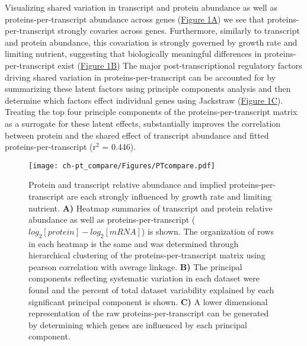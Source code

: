 Visualizing shared variation in transcript and protein abundance as well as proteins-per-transcript abundance across genes (\hyperref[ptHM]{Figure \ref{ptHM}A}) we see that proteins-per-transcript strongly covaries across genes.  Furthermore, similarly to transcript and protein abundance, this covariation is strongly governed by growth rate and limiting nutrient, suggesting that biologically meaningful differences in proteins-per-transcript exist (\hyperref[ptHM]{Figure \ref{ptHM}B}) The major post-transcriptional regulatory factors driving shared variation in proteins-per-transcript can be accounted for by summarizing these latent factors using principle components analysis and then determine which factors effect individual genes using Jackstraw \cite{Chung:2015bq} (\hyperref[ptHM]{Figure \ref{ptHM}C}). Treating the top four principle components of the proteins-per-transcript matrix as a surrogate for these latent effects, substantially improves the correlation between protein and the shared effect of transcript abundance and fitted proteins-per-transcript (r$^{2}$ = 0.446).

\begin{figure}[h!]
\begin{center}
\texttt{[image: ch-pt\_compare/Figures/PTcompare.pdf]}
\caption[Protein and transcript relative abundance and implied proteins-per-transcript are each strongly influenced by growth rate and limiting nutrient]{Protein and transcript relative abundance and implied proteins-per-transcript are each strongly influenced by growth rate and limiting nutrient. \textbf{A)} Heatmap summaries of transcript and protein relative abundance as well as proteins-per-transcript ($log_{2}\left[protein\right] - log_{2}\left[mRNA\right]$) is shown. The organization of rows in each heatmap is the same and was determined through hierarchical clustering of the proteins-per-transcript matrix using pearson correlation with average linkage. \textbf{B)} The principal components reflecting systematic variation in each dataset were found and the percent of total dataset variability explained by each significant principal component is shown. \textbf{C)} A lower dimensional representation of the raw proteins-per-transcript can be generated by determining which genes are influenced by each principal component.}
\label{ptHM}
\end{center}
\end{figure}

